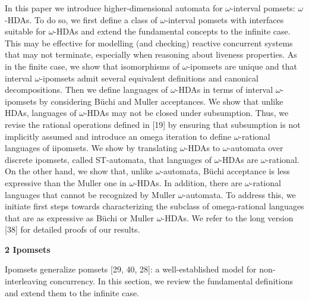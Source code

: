  
 
In this paper we introduce higher-dimensional automata for $\omega$-interval pomsets: $\omega$-HDAs. To do so, we first define a class of $\omega$-interval pomsets with interfaces suitable for $\omega$-HDAs and extend the fundamental concepts to the infinite case. This may be effective for modelling (and checking) reactive concurrent systems that may not terminate, especially when reasoning about liveness properties. As in the finite case, we show that isomorphisms of $\omega$-ipomsets are unique and that interval $\omega$-ipomsets admit several equivalent definitions and canonical decompositions. Then we define languages of $\omega$-HDAs in terms of interval $\omega$-ipomsets by considering Büchi and Muller acceptances. We show that unlike HDAs, languages of $\omega$-HDAs may not be closed under subsumption. Thus, we revise the rational operations defined in [19] by ensuring that subsumption is not implicitly assumed and introduce an omega iteration to define $\omega$-rational languages of iipomsets. We show by translating $\omega$-HDAs to $\omega$-automata over discrete ipomsets, called ST-automata, that languages of $\omega$-HDAs are $\omega$-rational. On the other hand, we show that, unlike $\omega$-automata, Büchi acceptance is less expressive than the Muller one in $\omega$-HDAs. In addition, there are $\omega$-rational languages that cannot be recognized by Muller $\omega$-automata. To address this, we initiate first steps towards characterizing the subclass of omega-rational languages that are as expressive as Büchi or Muller $\omega$-HDAs. We refer to the long version [38] for detailed proofs of our results.\par
 
 


 
\par\medskip\noindent\textbf{2 Ipomsets}\par
 
 
Ipomsets generalize pomsets [29, 40, 28]: a well-established model for non-interleaving concurrency. In this section, we review the fundamental definitions and extend them to the infinite case.\par
 
 
 
